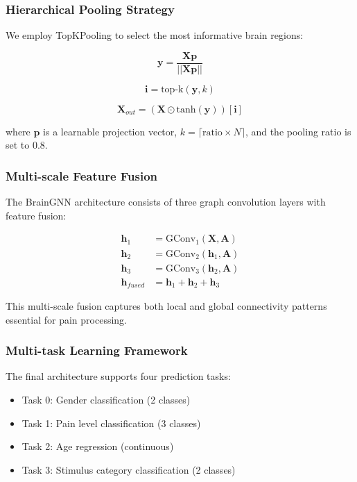 \documentclass[10pt,journal,compsoc]{IEEEtran}
\begin{document}
\subsubsection{Hierarchical Pooling Strategy}

We employ TopKPooling to select the most informative brain regions:

\begin{equation}
\mathbf{y} = \frac{\mathbf{X}\mathbf{p}}{||\mathbf{X}\mathbf{p}||}
\end{equation}

\begin{equation}
\mathbf{i} = \text{top-k}(\mathbf{y}, k)
\end{equation}

\begin{equation}
\mathbf{X}_{out} = (\mathbf{X} \odot \text{tanh}(\mathbf{y}))[\mathbf{i}]
\end{equation}

where $\mathbf{p}$ is a learnable projection vector, $k = \lceil \text{ratio} \times N \rceil$, and the pooling ratio is set to 0.8.

\subsubsection{Multi-scale Feature Fusion}

The BrainGNN architecture consists of three graph convolution layers with feature fusion:

\begin{align}
\mathbf{h}_1 &= \text{GConv}_1(\mathbf{X}, \mathbf{A}) \\
\mathbf{h}_2 &= \text{GConv}_2(\mathbf{h}_1, \mathbf{A}) \\
\mathbf{h}_3 &= \text{GConv}_3(\mathbf{h}_2, \mathbf{A}) \\
\mathbf{h}_{fused} &= \mathbf{h}_1 + \mathbf{h}_2 + \mathbf{h}_3
\end{align}

This multi-scale fusion captures both local and global connectivity patterns essential for pain processing.

\subsubsection{Multi-task Learning Framework}

The final architecture supports four prediction tasks:
\begin{itemize}
\item Task 0: Gender classification (2 classes)
\item Task 1: Pain level classification (3 classes)  
\item Task 2: Age regression (continuous)
\item Task 3: Stimulus category classification (2 classes)
\end{itemize}
\end{document}
